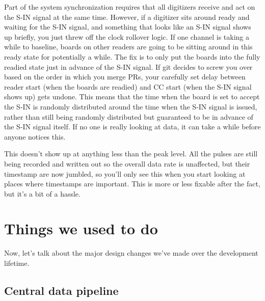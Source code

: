 Part of the system synchronization requires that all digitizers receive and act on the S-IN signal at the same time.
However, if a digitizer sits around ready and waiting for the S-IN signal, and something that looks like an S-IN signal shows up briefly, you just threw off the clock rollover logic.
If one channel is taking a while to baseline, boards on other readers are going to be sitting around in this ready state for potentially a while.
The fix is to only put the boards into the fully readied state just in advance of the S-IN signal.
If git decides to screw you over based on the order in which you merge PRs, your carefully set delay between reader start (when the boards are readied) and CC start (when the S-IN signal shows up) gets undone.
This means that the time when the board is set to accept the S-IN is randomly distributed around the time when the S-IN signal is issued, rather than still being randomly distributed but guaranteed to be in advance of the S-IN signal itself.
If no one is really looking at data, it can take a while before anyone notices this.

This doesn't show up at anything less than the peak level.
All the pulses are still being recorded and written out so the overall data rate is unaffected, but their timestamp are now jumbled, so you'll only see this when you start looking at places where timestamps are important.
This is more or less fixable after the fact, but it's a bit of a hassle.

\section{Things we used to do}

Now, let's talk about the major design changes we've made over the development lifetime.

\subsection{Central data pipeline}

